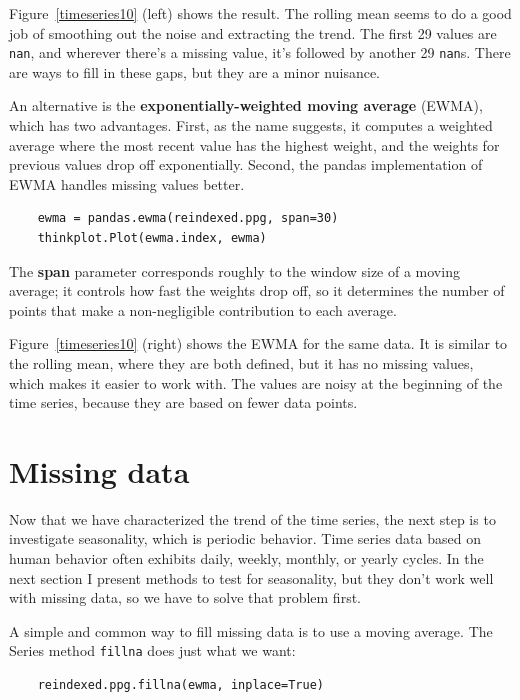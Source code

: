 \documentclass[12pt]{book}
\begin{document}
Figure~\ref{timeseries10} (left)
shows the result. 
The rolling mean seems to do a good job of smoothing out the noise and
extracting the trend.  The first 29 values are {\tt nan}, and wherever
there's a missing value, it's followed by another 29 {\tt nan}s.
There are ways to fill in these gaps, but they are a minor nuisance.

An alternative is the {\bf exponentially-weighted moving average} (EWMA),
which has two advantages.  First, as the name suggests, it computes
a weighted average where the most recent value has the highest weight,
and the weights for previous values drop off exponentially.
Second, the pandas implementation of EWMA handles missing values
better.

\begin{verbatim}
    ewma = pandas.ewma(reindexed.ppg, span=30)
    thinkplot.Plot(ewma.index, ewma)
\end{verbatim}

The {\bf span} parameter corresponds roughly to the window size of
a moving average; it controls how fast the weights drop off, so it
determines the number of points that make a non-negligible contribution
to each average.

Figure~\ref{timeseries10} (right) shows the EWMA for the same data.
It is similar to the rolling mean, where they are both defined,
but it has no missing values, which makes it easier to work with.  The
values are noisy at the beginning of the time series, because they are
based on fewer data points.


\section{Missing data}

Now that we have characterized the trend of the time series, the
next step is to investigate seasonality, which is periodic behavior.
Time series data based on human behavior often exhibits daily,
weekly, monthly, or yearly cycles.  In the next section I present
methods to test for seasonality, but they don't work well with
missing data, so we have to solve that problem first.

A simple and common way to fill missing data is to use a moving
average.  The Series method {\tt fillna} does just what we want:

\begin{verbatim}
    reindexed.ppg.fillna(ewma, inplace=True)
\end{verbatim}
\end{document}
